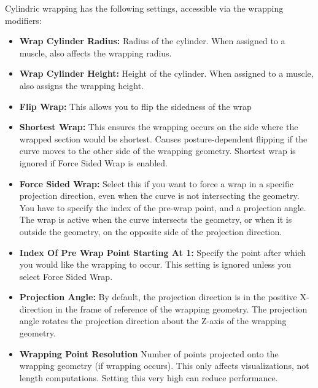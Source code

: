 \documentclass{article}
\begin{document}
Cylindric wrapping has the following settings, accessible via the wrapping modifiers:

\begin{itemize}
\item \textbf{Wrap Cylinder Radius:} Radius of the cylinder. When assigned to a muscle, also affects the wrapping radius.
\item \textbf{Wrap Cylinder Height:} Height of the cylinder. When assigned to a muscle, also assigns the wrapping height.
\item \textbf{Flip Wrap:} This allows you to flip the sidedness of the wrap
\item \textbf{Shortest Wrap:} This ensures the wrapping occurs on the side where the wrapped section would be shortest. Causes posture-dependent flipping if the curve moves to the other side of the wrapping geometry. Shortest wrap is ignored if Force Sided Wrap is enabled.
\item \textbf{Force Sided Wrap:} Select this if you want to force a wrap in a specific projection direction, even when the curve is not intersecting the geometry. You have to specify the index of the pre-wrap point, and a projection angle. The wrap is active when the curve intersects the geometry, or when it is outside the geometry, on the opposite side of the projection direction.
\item \textbf{Index Of Pre Wrap Point Starting At 1:} Specify the point after which you would like the wrapping to occur. This setting is ignored unless you select Force Sided Wrap.
\item \textbf{Projection Angle:} By default, the projection direction is in the positive X-direction in the frame of reference of the wrapping geometry. The projection angle rotates the projection direction about the Z-axis of the wrapping geometry.
\item \textbf{Wrapping Point Resolution} Number of points projected onto the wrapping geometry (if wrapping occurs). This only affects visualizations, not length computations. Setting this very high can reduce performance.
\end{itemize}


\end{document}
